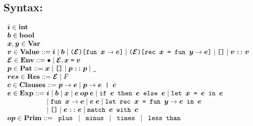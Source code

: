 \documentclass[11pt]{jarticle}
\begin{document}


\subsection*{Syntax:}

\[\begin{array}{l}
\EvalMLvMV{i}[] \in \mathbf{int}\\
\EvalMLvMV{b}[] \in \mathbf{bool}\\
\EvalMLvMV{x}[], \EvalMLvMV{y}[] \in \mathbf{Var}\\
\EvalMLvMV{v}[] \in \mathbf{Value} ::= \EvalMLvMV{i}[] \mid \EvalMLvMV{b}[]
\mid \EvalMLvFunTerm{\EvalMLvMV{env}[]}{\EvalMLvMV{x}[]}{\EvalMLvMV{e}[]}
\mid \EvalMLvRecTerm{\EvalMLvMV{env}[]}{\EvalMLvMV{x}[]}{\EvalMLvMV{y}[]}
{\EvalMLvMV{e}[]} \mid \EvalMLvNilVTerm
\mid \EvalMLvConsVTerm{\EvalMLvMV{v}[]}{\EvalMLvMV{v}[]}\\
\EvalMLvMV{env}[] \in \mathbf{Env} ::= \EvalMLvEmptyTerm
\mid \EvalMLvBindTerm{\EvalMLvMV{env}[]}{\EvalMLvMV{x}[]}
{\EvalMLvMV{v}[]}\\
\EvalMLvMV{p}[] \in \mathbf{Pat} ::= \EvalMLvMV{x}[] \mid \EvalMLvNilPTerm
\mid \EvalMLvConsPTerm{\EvalMLvMV{p}[]}{\EvalMLvMV{p}[]}
\mid \EvalMLvWildPTerm\\
\EvalMLvMV{res}[] \in \mathbf{Res} ::= \EvalMLvMV{env}[]
\mid \EvalMLvFailTerm\\
\EvalMLvMV{c}[] \in \mathbf{Clauses} ::= \EvalMLvSingleCTerm{\EvalMLvMV{p}[]}
{\EvalMLvMV{e}[]} \mid \EvalMLvAddCTerm{\EvalMLvMV{p}[]}{\EvalMLvMV{e}[]}
{\EvalMLvMV{c}[]}\\
\EvalMLvMV{e}[] \in \mathbf{Exp} ::= \EvalMLvMV{i}[] \mid \EvalMLvMV{b}[]
\mid \EvalMLvMV{x}[] \mid \EvalMLvBinOpTerm{\EvalMLvMV{op}[]}
{\EvalMLvMV{e}[]}{\EvalMLvMV{e}[]} \mid \EvalMLvIfTerm{\EvalMLvMV{e}[]}
{\EvalMLvMV{e}[]}{\EvalMLvMV{e}[]} \mid \EvalMLvLetTerm{\EvalMLvMV{x}[]}
{\EvalMLvMV{e}[]}{\EvalMLvMV{e}[]}  \\ \hspace*{2.0cm}
\mid \EvalMLvAbsTerm{\EvalMLvMV{x}[]}
{\EvalMLvMV{e}[]} \mid \EvalMLvAppTerm{\EvalMLvMV{e}[]}{\EvalMLvMV{e}[]}
\mid \EvalMLvLetRecTerm{\EvalMLvMV{x}[]}{\EvalMLvMV{y}[]}{\EvalMLvMV{e}[]}
{\EvalMLvMV{e}[]}  \\ \hspace*{2.0cm}
\mid \EvalMLvNilTerm \mid \EvalMLvConsTerm{\EvalMLvMV{e}[]}
{\EvalMLvMV{e}[]} \mid \EvalMLvMatchTerm{\EvalMLvMV{e}[]}
{\EvalMLvMV{c}[]}\\
\EvalMLvMV{op}[] \in \mathbf{Prim} ::= \EvalMLvPlusTerm
\mid \EvalMLvMinusTerm \mid \EvalMLvMultTerm
\mid \EvalMLvLtTerm\\
\end{array}\]
\end{document}
